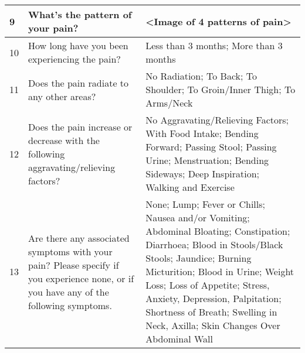 \begin{table}[htbp]
{\begin{tabular}{|p{1cm}|p{5cm}|p{8cm}|}
            9       & What's the pattern of your pain?                                                                                                       & \textless{}Image of 4 patterns of pain\textgreater{}                                                                                                                                                                                                                                                                                    \\ \hline
            10      & How long have you been experiencing the pain?                                                                                          & Less than 3 months; More than 3 months                                                                                                                                                                                                                                                                                                  \\ \hline
            11      & Does the pain radiate to any other areas?                                                                                              & No Radiation; To Back; To Shoulder; To Groin/Inner Thigh; To Arms/Neck                                                                                                                                                                                                                                                                  \\ \hline
            12      & Does the pain increase or decrease with the following aggravating/relieving factors?                                                   & No Aggravating/Relieving Factors; With Food Intake; Bending Forward; Passing Stool; Passing Urine; Menstruation; Bending Sideways; Deep Inspiration; Walking and Exercise                                                                                                                                                               \\ \hline
            13      & Are there any associated symptoms with your pain? Please specify if you experience none, or if you have any of the following symptoms. & None; Lump; Fever or Chills; Nausea and/or Vomiting; Abdominal Bloating; Constipation; Diarrhoea; Blood in Stools/Black Stools; Jaundice; Burning Micturition; Blood in Urine; Weight Loss; Loss of Appetite; Stress, Anxiety, Depression, Palpitation; Shortness of Breath; Swelling in Neck, Axilla; Skin Changes Over Abdominal Wall \\ \hline

\end{tabular}}
\end{table}
